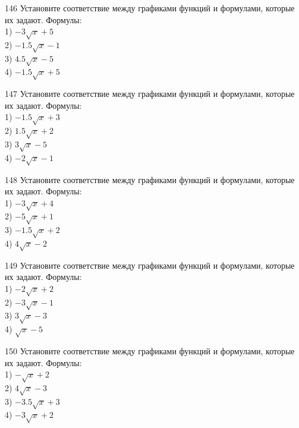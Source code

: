 \documentclass[4apaper]{article}
\begin{document}
\begin{taskBN}{146}
Установите соответствие между графиками функций и формулами, которые их задают. Формулы: \\1) $-3\sqrt{x}+5$\\2) $-1.5\sqrt{x}-1$\\3) $4.5\sqrt{x}-5$\\4) $-1.5\sqrt{x}+5$
\end{taskBN}

\begin{taskBN}{147}
Установите соответствие между графиками функций и формулами, которые их задают. Формулы: \\1) $-1.5\sqrt{x}+3$\\2) $1.5\sqrt{x}+2$\\3) $3\sqrt{x}-5$\\4) $-2\sqrt{x}-1$
\end{taskBN}

\begin{taskBN}{148}
Установите соответствие между графиками функций и формулами, которые их задают. Формулы: \\1) $-3\sqrt{x}+4$\\2) $-5\sqrt{x}+1$\\3) $-1.5\sqrt{x}+2$\\4) $4\sqrt{x}-2$
\end{taskBN}

\begin{taskBN}{149}
Установите соответствие между графиками функций и формулами, которые их задают. Формулы: \\1) $-2\sqrt{x}+2$\\2) $-3\sqrt{x}-1$\\3) $3\sqrt{x}-3$\\4) $\sqrt{x}-5$
\end{taskBN}

\begin{taskBN}{150}
Установите соответствие между графиками функций и формулами, которые их задают. Формулы: \\1) $-\sqrt{x}+2$\\2) $4\sqrt{x}-3$\\3) $-3.5\sqrt{x}+3$\\4) $-3\sqrt{x}+2$
\end{taskBN}
\end{document}
